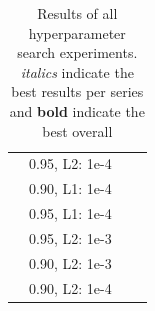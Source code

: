 {{\begin{table}[t]
\begin{tabular}{c|c|cc}
                 & 0.95, L2: 1e-4  &                     &                   \\
                 & 0.90, L1: 1e-4                   &                     &                   \\
                 & 0.95, L1: 1e-4                   &                     &                   \\
                 & 0.95, L2: 1e-3                   &                     &                   \\
                 & 0.90, L2: 1e-3                   &                     &                   \\
                 & 0.90, L2: 1e-4                  &                     &                   \\
    \bottomrule
    \end{tabular}
    \caption{Results of all hyperparameter search experiments. \emph{italics} indicate the best results per series and \textbf{bold} indicate the best overall}
    \label{tab:hp_search}
\end{table}
}
}

